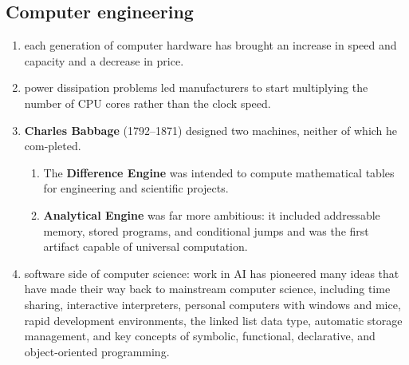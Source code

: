 \subsection{Computer engineering}
\begin{enumerate}
    \item each generation of computer hardware has brought an increase in speed and capacity and a decrease in price.

    \item power dissipation problems led manufacturers to start multiplying the number of CPU cores rather than the clock speed.

    \item \textbf{Charles Babbage} (1792–1871) designed two machines, neither of which he com-pleted.
    \begin{enumerate}
        \item The \textbf{Difference Engine} was intended to compute mathematical tables for engineering and scientific projects. 

        \item \textbf{Analytical Engine} was far more ambitious: it included addressable memory, stored programs, and conditional jumps and was the first artifact capable of universal computation.
    \end{enumerate}

    \item software side of computer science: work in AI has pioneered many ideas that have made their way back to mainstream computer science, including time sharing, interactive interpreters, personal computers with windows and mice, rapid development environments, the linked list data type, automatic storage management, and key concepts of symbolic, functional, declarative, and object-oriented programming.
\end{enumerate}

